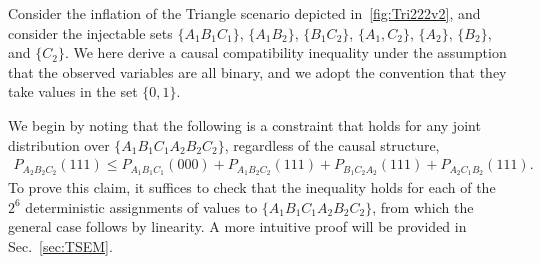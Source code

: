 

\bigskip

\smallskip\nobreak



Consider the inflation of the Triangle scenario depicted in~\cref{fig:Tri222v2}, and consider the injectable sets $\{A_1 B_1 C_1\}$, $\{A_1 B_2\}$, $\{B_1 C_2\}$, $\{ A_1, C_2\}$, $\{A_2\}$, $\{B_2\}$, and $\{C_2\}$.
We here derive a causal compatibility inequality under the assumption that the observed variables are all binary, and we adopt the convention that they take values in the set $\{0,1\}$.

We begin by noting that the following is a constraint that holds for any joint distribution over $\{A_1 B_1 C_1 A_2 B_2 C_2\}$, regardless of the causal structure, 
\begin{align}\label{eq:FritzF3raw}
	P_{A_2 B_2 C_2}(111) \leq P_{A_1 B_1 C_1}(000) + P_{A_1 B_2 C_2}(111) + P_{B_1 C_2 A_2}(111) + P_{A_2  C_1 B_2}(111).
\end{align}
To prove this claim, it suffices to check that the inequality holds for each of the $2^6$ deterministic assignments of values to $\{A_1 B_1 C_1 A_2 B_2 C_2\}$, from which the general case follows by linearity.  A more intuitive proof will be provided in Sec.~\ref{sec:TSEM}.

